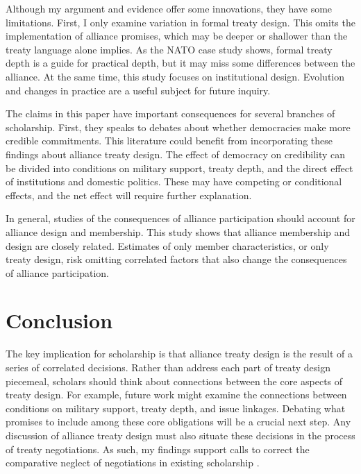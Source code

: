 \documentclass[12pt]{article}
\begin{document}
Although my argument and evidence offer some innovations, they have some limitations. 
First, I only examine variation in formal treaty design. 
This omits the implementation of alliance promises, which may be deeper or shallower than the treaty language alone implies. 
As the NATO case study shows, formal treaty depth is a guide for practical depth, but it may miss some differences between the alliance. 
At the same time, this study focuses on institutional design. 
Evolution and changes in practice are a useful subject for future inquiry. 


The claims in this paper have important consequences for several branches of scholarship. 
First, they speaks to debates about whether democracies make more credible commitments. 
This literature could benefit from incorporating these findings about alliance treaty design. 
The effect of democracy on credibility can be divided into conditions on military support, treaty depth, and the direct effect of institutions and domestic politics. 
These may have competing or conditional effects, and the net effect will require further explanation. 


In general, studies of the consequences of alliance participation should account for alliance design and membership. 
This study shows that alliance membership and design are closely related. 
Estimates of only member characteristics, or only treaty design, risk omitting correlated factors that also change the consequences of alliance participation. 


\section{Conclusion}



The key implication for scholarship is that alliance treaty design is the result of a series of correlated decisions. 
Rather than address each part of treaty design piecemeal, scholars should think about connections between the core aspects of treaty design. 
For example, future work might examine the connections between conditions on military support, treaty depth, and issue linkages.  
Debating what promises to include among these core obligations will be a crucial next step. 
Any discussion of alliance treaty design must also situate these decisions in the process of treaty negotiations.
As such, my findings support calls to correct the comparative neglect of negotiations in existing scholarship \citep{Poast2019a}. 
\end{document}
